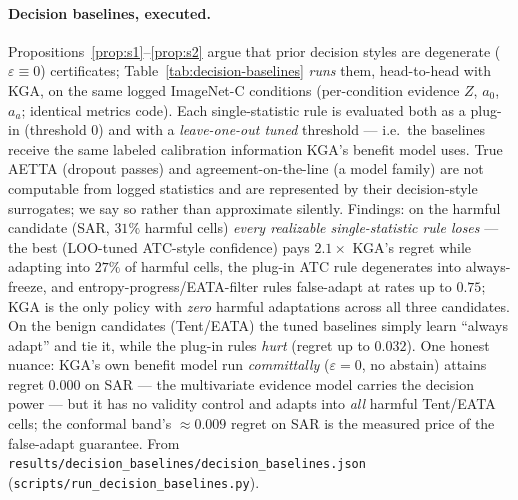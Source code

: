 \documentclass[conference]{IEEEtran}
\theoremstyle{plain}
\theoremstyle{definition}
\begin{document}
\paragraph{Decision baselines, executed.}
Propositions~\ref{prop:s1}--\ref{prop:s2} argue that prior decision styles are
degenerate ($\varepsilon{\equiv}0$) certificates; Table~\ref{tab:decision-baselines}
\emph{runs} them, head-to-head with \textsc{KGA}, on the same logged ImageNet-C
conditions (per-condition evidence $Z$, $a_0$, $a_a$; identical metrics code). Each
single-statistic rule is evaluated both as a plug-in (threshold $0$) and with a
\emph{leave-one-out tuned} threshold --- i.e.\ the baselines receive the same labeled
calibration information \textsc{KGA}'s benefit model uses. True AETTA (dropout passes)
and agreement-on-the-line (a model family) are not computable from logged statistics
and are represented by their decision-style surrogates; we say so rather than
approximate silently. Findings: on the harmful candidate (SAR, $31\%$ harmful cells)
\emph{every realizable single-statistic rule loses} --- the best (LOO-tuned
ATC-style confidence) pays $2.1\times$ \textsc{KGA}'s regret while adapting into
$27\%$ of harmful cells, the plug-in ATC rule degenerates into always-freeze, and
entropy-progress/EATA-filter rules false-adapt at rates up to $0.75$; \textsc{KGA} is
the only policy with \emph{zero} harmful adaptations across all three candidates. On
the benign candidates (Tent/EATA) the tuned baselines simply learn ``always adapt''
and tie it, while the plug-in rules \emph{hurt} (regret up to $0.032$). One honest
nuance: \textsc{KGA}'s own benefit model run \emph{committally}
($\varepsilon{=}0$, no abstain) attains regret $0.000$ on SAR --- the multivariate
evidence model carries the decision power --- but it has no validity control and
adapts into \emph{all} harmful Tent/EATA cells; the conformal band's $\approx0.009$
regret on SAR is the measured price of the false-adapt guarantee. From
\texttt{results/decision\_baselines/decision\_baselines.json}
(\texttt{scripts/run\_decision\_baselines.py}).
\end{document}
